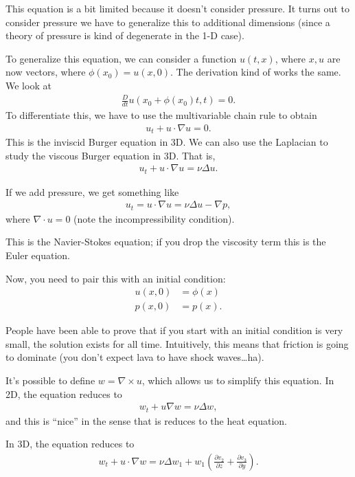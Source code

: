 \documentclass{article}
\begin{document}
This equation is a bit limited because it doesn't consider pressure.  It turns out to consider pressure we have to generalize this to additional dimensions (since a theory of pressure is kind of degenerate in the 1-D case).  

To generalize this equation, we can consider a function $u(t, x)$, where $x, u$ are now vectors, where $\phi(x_0) = u(x, 0)$.  The derivation kind of works the same.  We look at
\begin{align*}
  \frac{D}{dt} u(x_0 + \phi(x_0) t, t) = 0.
\end{align*}
To differentiate this, we have to use the multivariable chain rule to obtain
\begin{align*}
  u_t + u \cdot \nabla u = 0.
\end{align*}
This is the inviscid Burger equation in 3D.   We can also use the Laplacian to study the viscous Burger equation in 3D.  That is,
\begin{align*}
  u_t + u \cdot \nabla u = \nu \Delta u.
\end{align*}

If we add pressure, we get something like
\begin{align*}
  u_t = u \cdot \nabla u = \nu \Delta u - \nabla p,
\end{align*}
where $\nabla \cdot u = 0$ (note the incompressibility condition).

This is the Navier-Stokes equation; if you drop the viscosity term this is the Euler equation.

Now, you need to pair this with an initial condition:
\begin{align*}
  u(x, 0) &= \phi(x) \\
  p(x, 0) &= p(x).
\end{align*}

People have been able to prove that if you start with an initial condition is very small, the solution exists for all time.  Intuitively, this means that friction is going to dominate (you don't expect lava to have shock waves\dots ha).

It's possible to define $w = \nabla \times u$, which allows us to simplify this equation.  In 2D, the equation reduces to
\begin{align*}
  w_t + u \nabla w = \nu \Delta w,
\end{align*}
and this is ``nice'' in the sense that is reduces to the heat equation.

In 3D, the equation reduces to
\begin{align*}
  w_t + u \cdot \nabla w = \nu \Delta w_1 + w_1 \left( \frac{\partial v_2}{\partial z} + \frac{\partial v_3}{\partial y} \right).
\end{align*}
\end{document}
